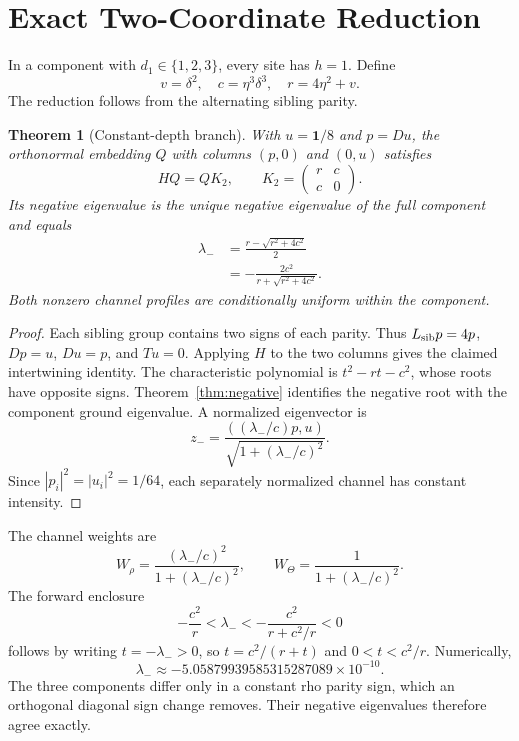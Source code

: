\documentclass[journal,a4paper,10pt]{IEEEtran}
\newtheorem{theorem}{Theorem}
\theoremstyle{definition}\newtheorem{definition}[theorem]{Definition}
\theoremstyle{remark}\newtheorem{remark}[theorem]{Remark}
\newcommand{\one}{\mathbf 1}
\begin{document}
\section{Exact Two-Coordinate Reduction}
In a component with $d_1\in\{1,2,3\}$, every site has $h=1$. Define
\begin{equation}\label{eq:r1}
v=\delta^2,\quad c=\eta^3\delta^3,\quad r=4\eta^2+v.
\end{equation}
The reduction follows from the alternating sibling parity.
\begin{theorem}[Constant-depth branch]\label{thm:two}
With $u=\one/8$ and $p=Du$, the orthonormal embedding $Q$ with columns $(p,0)$ and $(0,u)$ satisfies
\begin{equation}
HQ=QK_2,\qquad K_2=\begin{pmatrix}r&c\\c&0\end{pmatrix}.
\end{equation}
Its negative eigenvalue is the unique negative eigenvalue of the full component and equals
\begin{align}\label{eq:lminus}
\lambda_-&=\frac{r-\sqrt{r^2+4c^2}}2\nonumber\\
&=-\frac{2c^2}{r+\sqrt{r^2+4c^2}}.
\end{align}
Both nonzero channel profiles are conditionally uniform within the component.
\end{theorem}
\begin{proof}
Each sibling group contains two signs of each parity. Thus $L_{\rm sib}p=4p$, $Dp=u$, $Du=p$, and $Tu=0$. Applying $H$ to the two columns gives the claimed intertwining identity. The characteristic polynomial is $t^2-rt-c^2$, whose roots have opposite signs. Theorem~\ref{thm:negative} identifies the negative root with the component ground eigenvalue. A normalized eigenvector is
\begin{equation}\label{eq:zminus}
z_- =\frac{((\lambda_-/c)p,u)}{\sqrt{1+(\lambda_-/c)^2}}.
\end{equation}
Since $|p_i|^2=|u_i|^2=1/64$, each separately normalized channel has constant intensity.
\end{proof}
The channel weights are
\begin{equation}
W_\rho=\frac{(\lambda_-/c)^2}{1+(\lambda_-/c)^2},\qquad
W_\Theta=\frac1{1+(\lambda_-/c)^2}.
\end{equation}
The forward enclosure
\begin{equation}\label{eq:lambda-forward}
-\frac{c^2}{r}<\lambda_-<
-\frac{c^2}{r+c^2/r}<0
\end{equation}
follows by writing $t=-\lambda_->0$, so $t=c^2/(r+t)$ and $0<t<c^2/r$. Numerically,
\begin{equation}
\lambda_-\approx-5.05879939585315287089\times10^{-10}.
\end{equation}
The three components differ only in a constant rho parity sign, which an orthogonal diagonal sign change removes. Their negative eigenvalues therefore agree exactly.
\end{document}
